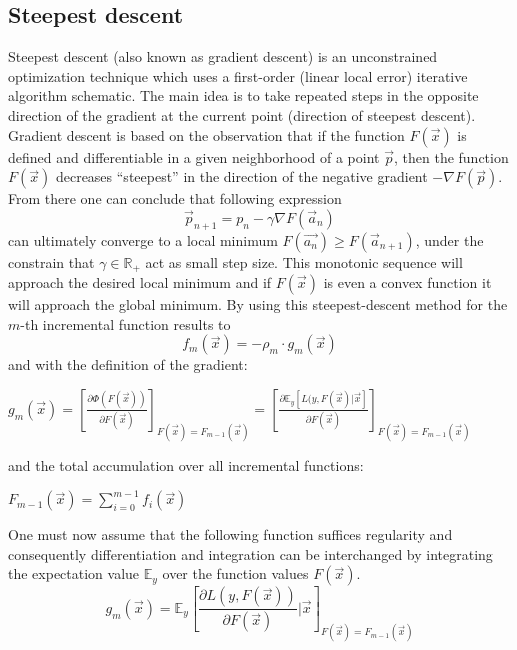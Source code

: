\documentclass[12pt, a4paper]{article}
\begin{document}
\subsection{Steepest descent}
Steepest descent (also known as gradient descent) is an unconstrained optimization technique which uses a first-order (linear local error) iterative algorithm schematic. The main idea is to take repeated steps in the opposite direction of the gradient at the current point (direction of steepest descent). Gradient descent is based on the observation that if the function $F(\vec{x})$ is defined and differentiable in a given neighborhood of a point $\vec{p}$, then the function $F(\vec{x})$ decreases ``steepest'' in the direction of the negative gradient $- \nabla F(\vec{p})$. From there one can conclude that following expression
\begin{equation}
    \vec{p}_{n+1} = p_n - \gamma \nabla F(\vec{a}_n)
\end{equation}
can ultimately converge to a local minimum $F(\vec{a_n}) \geq F(\vec{a}_{n+1})$, under the constrain that $\gamma \in \mathbb{R}_{+}$ act as small step size. This monotonic sequence will approach the desired local minimum and if $F(\vec{x})$ is even a convex function it will approach the global minimum. By using this steepest-descent method for the $m$-th incremental function results to
\begin{equation}
    \label{eq: incr_function}
    f_m(\vec{x}) = - \rho_m \cdot g_m(\vec{x})
\end{equation}
and with the definition of the gradient:
\begin{center}
    $g_m(\vec{x}) = [\frac{\partial \Phi(F(\vec{x}))}{\partial F(\vec{x})}]_{F(\vec{x}) = F_{m-1}(\vec{x})} = [\frac{\partial \mathbb{E}_y [L(y,F(\vec{x})|\vec{x}]}{\partial F(\vec{x})}]_{F(\vec{x}) = F_{m-1}(\vec{x})}$
\end{center}
and the total accumulation over all incremental functions:
\begin{center}
    $F_{m-1}(\vec{x}) = \sum_{i=0}^{m-1} f_i(\vec{x})$
\end{center}
One must now assume that the following function suffices regularity and consequently differentiation and integration can be interchanged by integrating the expectation value $\mathbb{E}_y$ over the function values $F(\vec{x})$.
\begin{equation}
    g_m(\vec{x}) = \mathbb{E}_y \left[\frac{\partial L(y, F(\vec{x}))}{\partial F(\vec{x})} | \vec{x}\right]_{F(\vec{x}) = F_{m-1}(\vec{x})}
\end{equation}
\end{document}
